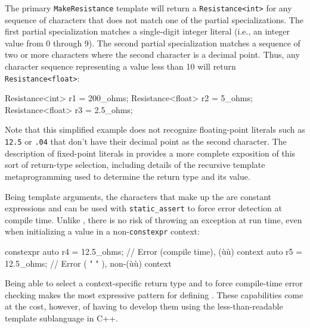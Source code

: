 \noindent The primary \lstinline!MakeResistance! template will return a
\lstinline!Resistance<int>! for any sequence of characters that does not
match one of the partial specializations. The first partial
specialization matches a single-digit integer literal (i.e., an integer
value from 0 through 9). The second partial specialization matches a
sequence of two or more characters where the second character is a
decimal point. Thus, any character sequence representing a value less
than 10 will return \lstinline!Resistance<float>!:

\begin{emcppslisting}[emcppsbatch=e12]
Resistance<int>   r1 = 200_ohms;
Resistance<float> r2 = 5_ohms;
Resistance<float> r3 = 2.5_ohms;
\end{emcppslisting}
    
\noindent Note that this simplified example does not recognize floating-point
literals such as \lstinline!12.5! or \lstinline!.04! that don't have their
decimal point as the second character. The description of fixed-point
literals in  provides a more complete exposition of this sort
of return-type selection, including details of the recursive template
metaprogramming used to determine the return type and its value.

Being template arguments, the characters that make up the  are constant expressions and can be used with
\lstinline!static_assert! to force error detection at compile time. Unlike
, there is no risk of throwing an exception at
run time, even when initializing a value in a non-\lstinline!constexpr!
context:

\begin{emcppslisting}
constexpr auto r4 = 12.5_ohms;  // Error (compile time), (ù{}ù) context
          auto r5 = 12.5_ohms;  // Error (   "      " ), non-(ù{}ù) context
\end{emcppslisting}
    
\noindent Being able to select a context-specific return type and to force
compile-time error checking makes  the
most expressive pattern for defining . These
capabilities come at the cost, however, of having to develop them using
the less-than-readable template sublanguage in C++.

